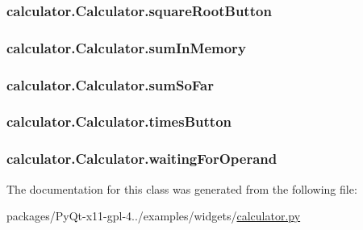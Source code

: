 \subsubsection[{square\+Root\+Button}]{\setlength{\rightskip}{0pt plus 5cm}calculator.\+Calculator.\+square\+Root\+Button}\label{classcalculator_1_1Calculator_a9621a8f34a1f58028d416a066fc2093c}
\hypertarget{classcalculator_1_1Calculator_abb765b5d8adbd919a74f5f2c3b195ff3}{}
\subsubsection[{sum\+In\+Memory}]{\setlength{\rightskip}{0pt plus 5cm}calculator.\+Calculator.\+sum\+In\+Memory}\label{classcalculator_1_1Calculator_abb765b5d8adbd919a74f5f2c3b195ff3}
\hypertarget{classcalculator_1_1Calculator_a50d1f5f6520fd0dd45f3364698d57cbe}{}
\subsubsection[{sum\+So\+Far}]{\setlength{\rightskip}{0pt plus 5cm}calculator.\+Calculator.\+sum\+So\+Far}\label{classcalculator_1_1Calculator_a50d1f5f6520fd0dd45f3364698d57cbe}
\hypertarget{classcalculator_1_1Calculator_a9fc0b6ee9f55915e1870847031133e00}{}
\subsubsection[{times\+Button}]{\setlength{\rightskip}{0pt plus 5cm}calculator.\+Calculator.\+times\+Button}\label{classcalculator_1_1Calculator_a9fc0b6ee9f55915e1870847031133e00}
\hypertarget{classcalculator_1_1Calculator_a82e6d682035973f2120d60af0debf837}{}
\subsubsection[{waiting\+For\+Operand}]{\setlength{\rightskip}{0pt plus 5cm}calculator.\+Calculator.\+waiting\+For\+Operand}\label{classcalculator_1_1Calculator_a82e6d682035973f2120d60af0debf837}


The documentation for this class was generated from the following file\+:\begin{DoxyCompactItemize}
\item 
packages/\+Py\+Qt-\/x11-\/gpl-\/4../examples/widgets/\hyperlink{calculator_8py}{calculator.\+py}\end{DoxyCompactItemize}
